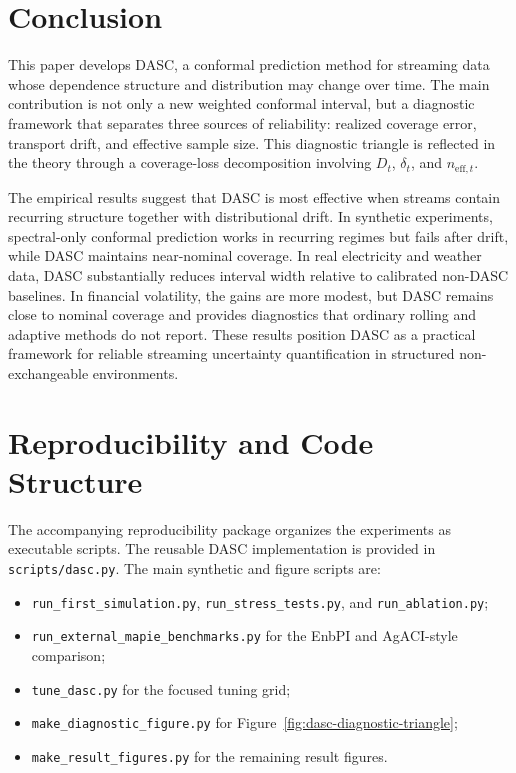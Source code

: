 \documentclass[11pt]{article}
\begin{document}
\section{Conclusion}

This paper develops DASC, a conformal prediction method for streaming data whose dependence structure and distribution may change over time. The main contribution is not only a new weighted conformal interval, but a diagnostic framework that separates three sources of reliability: realized coverage error, transport drift, and effective sample size. This diagnostic triangle is reflected in the theory through a coverage-loss decomposition involving $D_t$, $\delta_t$, and $n_{\mathrm{eff},t}$.

The empirical results suggest that DASC is most effective when streams contain recurring structure together with distributional drift. In synthetic experiments, spectral-only conformal prediction works in recurring regimes but fails after drift, while DASC maintains near-nominal coverage. In real electricity and weather data, DASC substantially reduces interval width relative to calibrated non-DASC baselines. In financial volatility, the gains are more modest, but DASC remains close to nominal coverage and provides diagnostics that ordinary rolling and adaptive methods do not report. These results position DASC as a practical framework for reliable streaming uncertainty quantification in structured non-exchangeable environments.

\appendix

\section{Reproducibility and Code Structure}

The accompanying reproducibility package organizes the experiments as executable scripts. The reusable DASC implementation is provided in \texttt{scripts/dasc.py}. The main synthetic and figure scripts are:
\begin{itemize}
    \item \texttt{run\_first\_simulation.py}, \texttt{run\_stress\_tests.py}, and \texttt{run\_ablation.py};
    \item \texttt{run\_external\_mapie\_benchmarks.py} for the EnbPI and AgACI-style comparison;
    \item \texttt{tune\_dasc.py} for the focused tuning grid;
    \item \texttt{make\_diagnostic\_figure.py} for Figure~\ref{fig:dasc-diagnostic-triangle};
    \item \texttt{make\_result\_figures.py} for the remaining result figures.
\end{itemize}
\end{document}
